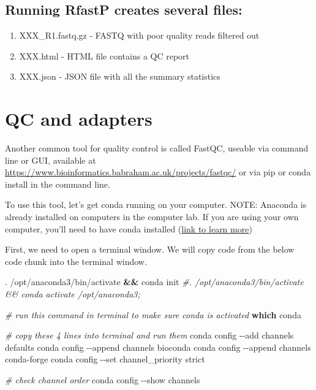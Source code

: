 \documentclass[
]{book}
\newenvironment{Shaded}{\begin{snugshade}}{\end{snugshade}}
\newcommand{\AttributeTok}[1]{\textcolor[rgb]{0.13,0.29,0.53}{#1}}
\newcommand{\BuiltInTok}[1]{#1}
\newcommand{\CommentTok}[1]{\textcolor[rgb]{0.56,0.35,0.01}{\textit{#1}}}
\newcommand{\ExtensionTok}[1]{#1}
\newcommand{\FunctionTok}[1]{\textcolor[rgb]{0.13,0.29,0.53}{\textbf{#1}}}
\newcommand{\KeywordTok}[1]{\textcolor[rgb]{0.13,0.29,0.53}{\textbf{#1}}}
\newcommand{\NormalTok}[1]{#1}
\begin{document}
\hypertarget{running-rfastp-creates-several-files}{%
\subsection{Running RfastP creates several files:}\label{running-rfastp-creates-several-files}}

\begin{enumerate}
\def\labelenumi{\arabic{enumi}.}
\item
  XXX\_R1.fastq.gz - FASTQ with poor quality reads filtered out
\item
  XXX.html - HTML file contains a QC report
\item
  XXX.json - JSON file with all the summary statistics
\end{enumerate}

\hypertarget{qc-and-adapters}{%
\section{QC and adapters}\label{qc-and-adapters}}

Another common tool for quality control is called FastQC, useable via command line or GUI, available at \url{https://www.bioinformatics.babraham.ac.uk/projects/fastqc/} or via pip or conda install in the command line.

To use this tool, let's get conda running on your computer. NOTE: Anaconda is already installed on computers in the computer lab. If you are using your own computer, you'll need to have conda installed (\href{https://docs.conda.io/en/main/miniconda.html}{link to learn more})

First, we need to open a terminal window. We will copy code from the below code chunk into the terminal window.

\begin{Shaded}
\begin{Highlighting}[]
\BuiltInTok{.}\NormalTok{ /opt/anaconda3/bin/activate }\KeywordTok{\&\&} \ExtensionTok{conda}\NormalTok{ init}
\CommentTok{\#. /opt/anaconda3/bin/activate \&\& conda activate /opt/anaconda3;}

\CommentTok{\# run this command in terminal to make sure conda is activated}
\FunctionTok{which}\NormalTok{ conda}

\CommentTok{\# copy these 4 lines into terminal and run them}
\ExtensionTok{conda}\NormalTok{ config }\AttributeTok{{-}{-}add}\NormalTok{ channels defaults}
\ExtensionTok{conda}\NormalTok{ config }\AttributeTok{{-}{-}append}\NormalTok{ channels bioconda}
\ExtensionTok{conda}\NormalTok{ config }\AttributeTok{{-}{-}append}\NormalTok{ channels conda{-}forge}
\ExtensionTok{conda}\NormalTok{ config }\AttributeTok{{-}{-}set}\NormalTok{ channel\_priority strict}

\CommentTok{\# check channel order}
\ExtensionTok{conda}\NormalTok{ config }\AttributeTok{{-}{-}show}\NormalTok{ channels}
\end{Highlighting}
\end{Shaded}
\end{document}
